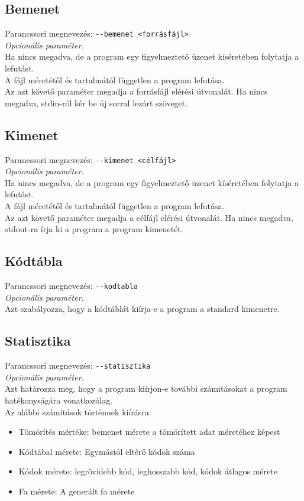\subsection{Bemenet}
\label{ssec:in}
Parancssori megnevezés: \texttt{-{}-bemenet <forrásfájl>} \\
{\it Opcionális paraméter.}\\
Ha nincs megadva, de a program egy figyelmeztető üzenet kíséretében folytatja a lefutást. \\
A fájl méretétől és tartalmától független a program lefutása. \\
Az azt követő paraméter megadja a forrásfájl elérési útvonalát. Ha nincs megadva, stdin-ról kér be új sorral lezárt szöveget.

\subsection{Kimenet}
\label{ssec:out}
Parancssori megnevezés: \texttt{-{}-kimenet <célfájl>} \\
{\it Opcionális paraméter.}\\
Ha nincs megadva, de a program egy figyelmeztető üzenet kíséretében folytatja a lefutást.\\
A fájl méretétől és tartalmától független a program lefutása. \\
Az azt követő paraméter megadja a célfájl elérési útvonalát. Ha nincs megadva, stdout-ra írja ki a program a program kimenetét.

\subsection{Kódtábla}
Parancssori megnevezés: \texttt{-{}-kodtabla} \\
{\it Opcionális paraméter.}\\
Azt szabályozza, hogy a kódtáblát kiírja-e a program a standard kimenetre.

\subsection{Statisztika}
Parancssori megnevezés: \texttt{-{}-statisztika} \\
{\it Opcionális paraméter.}\\
Azt határozza meg, hogy a program kiírjon-e további számitásokat a program hatékonyságára vonatkozólag.\\
Az alábbi számítások történnek kiírásra: \\
\begin{itemize}
    \item Tömörítés mértéke: bemenet mérete a tömörített adat méretéhez képest
    \item Kódtábal mérete: Egymástól eltérő kódok száma
    \item Kódok mérete: legrövidebb kód, leghosszabb kód, kódok átlagos mérete
    \item Fa mérete: A generált fa mérete
\end{itemize}


